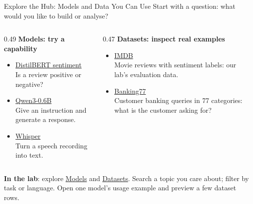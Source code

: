 \documentclass[aspectratio=169]{beamer}
\begin{document}
\begin{frame}{Explore the Hub: Models and Data You Can Use}
  \small Start with a question: what would you like to build or analyse?
  \par\vspace{0.5em}
  \begin{columns}[T,onlytextwidth]
    \begin{column}{0.49\linewidth}
      \textbf{Models: try a capability}
      \begin{itemize}
        \item \href{https://huggingface.co/distilbert/distilbert-base-uncased-finetuned-sst-2-english}{DistilBERT sentiment}\\Is a review positive or negative?
        \item \href{https://huggingface.co/Qwen/Qwen3-0.6B}{Qwen3-0.6B}\\Give an instruction and generate a response.
        \item \href{https://huggingface.co/openai/whisper-small}{Whisper}\\Turn a speech recording into text.
      \end{itemize}
    \end{column}
    \begin{column}{0.47\linewidth}
      \textbf{Datasets: inspect real examples}
      \begin{itemize}
        \item \href{https://huggingface.co/datasets/stanfordnlp/imdb}{IMDB}\\Movie reviews with sentiment labels: our lab's evaluation data.
        \item \href{https://huggingface.co/datasets/PolyAI/banking77}{Banking77}\\Customer banking queries in 77 categories: what is the customer asking for?
      \end{itemize}
    \end{column}
  \end{columns}
  \par\vspace{0.6em}
  \textbf{In the lab}: explore \href{https://huggingface.co/models}{Models} and \href{https://huggingface.co/datasets}{Datasets}. Search a topic you care about; filter by task or language. Open one model's usage example and preview a few dataset rows.
\end{frame}
\end{document}
